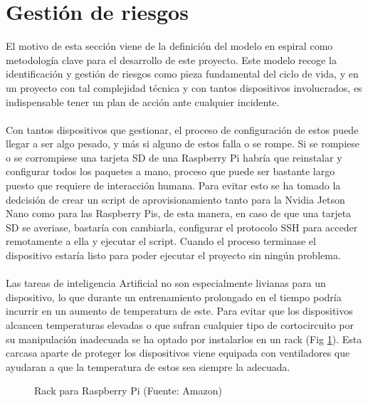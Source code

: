 \section{Gestión de riesgos}
El motivo de esta sección viene de la definición del modelo en espiral como metodología clave para el desarrollo de este proyecto. Este modelo recoge la identificación y gestión de riesgos como pieza fundamental del ciclo de vida, y en un proyecto con tal complejidad técnica y con tantos dispositivos involucrados, es indispensable tener un plan de acción ante cualquier incidente.
\\ \\
Con tantos dispositivos que gestionar, el proceso de configuración de estos puede llegar a ser algo pesado, y más si alguno de estos falla o se rompe. Si se rompiese o se corrompiese una tarjeta SD de una Raspberry Pi habría que reinstalar y configurar todos los paquetes a mano, proceso que puede ser bastante largo puesto que requiere de interacción humana. Para evitar esto se ha tomado la dedcisión de crear un script de aprovisionamiento tanto para la Nvidia Jetson Nano como para las Raspberry Pis, de esta manera, en caso de que una tarjeta SD se averiase, bastaría con cambiarla, configurar el protocolo SSH para acceder remotamente a ella y ejecutar el script. Cuando el proceso terminase el dispositivo estaría listo para poder ejecutar el proyecto sin ningún problema.
\\ \\
Las tareas de inteligencia Artificial no son especialmente livianas para un dispositivo, lo que durante un entrenamiento prolongado en el tiempo podría incurrir en un aumento de temperatura de este. Para evitar que los dispositivos alcancen temperaturas elevadas o que sufran cualquier tipo de cortocircuito por su manipulación inadecuada se ha optado por instalarlos en un rack (Fig \ref{fig:RackRaspberry}). Esta carcasa aparte de proteger los dispositivos viene equipada con ventiladores que ayudaran a que la temperatura de estos sea siempre la adecuada.

\begin{figure}[thbp]
    \centering
    \caption{Rack para Raspberry Pi (Fuente: Amazon\autocite{ParaRaspberryPi})}
    \label{fig:RackRaspberry}
\end{figure}

